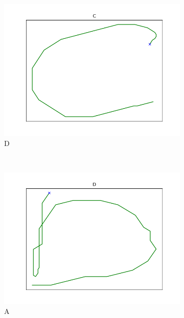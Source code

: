 \begin{figure}
\begin{subfigure}[b]{0.14\textwidth}
        \includegraphics[width=\textwidth]{images/gbem/orig_letters_fig/AORIG_letter_C_writer_5.png}
        \caption{D}
    \end{subfigure}
    ~
    \begin{subfigure}[b]{0.14\textwidth}
        \includegraphics[width=\textwidth]{images/gbem/orig_letters_fig/AORIG_letter_D_writer_6.png}
        \caption{A}
    \end{subfigure}
    ~ %
    \begin{subfigure}[b]{0.14\textwidth}

\end{subfigure}
\end{figure}
